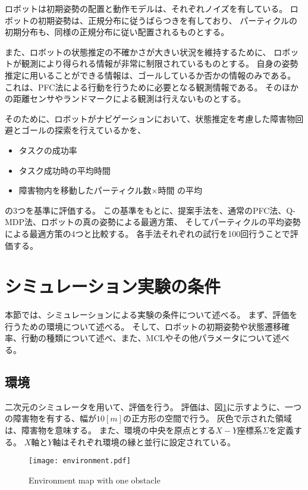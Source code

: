 ロボットは初期姿勢の配置と動作モデルは、それぞれノイズを有している。
ロボットの初期姿勢は、正規分布に従うばらつきを有しており、
パーティクルの初期分布も、同様の正規分布に従い配置されるものとする。

また、ロボットの状態推定の不確かさが大きい状況を維持するために、
ロボットが観測により得られる情報が非常に制限されているものとする。
自身の姿勢推定に用いることができる情報は、ゴールしているか否かの情報のみである。
これは、PFC法による行動を行うために必要となる観測情報である。
そのほかの距離センサやランドマークによる観測は行えないものとする。

そのために、ロボットがナビゲーションにおいて、状態推定を考慮した障害物回避とゴールの探索を行えているかを、
\begin{itemize}
  \item タスクの成功率
  \item タスク成功時の平均時間
  \item 障害物内を移動したパーティクル数×時間 の平均
\end{itemize}
の3つを基準に評価する。
この基準をもとに、提案手法を、通常のPFC法、Q-MDP法、ロボットの真の姿勢による最適方策、
そしてパーティクルの平均姿勢による最適方策の4つと比較する。
各手法それぞれの試行を100回行うことで評価する。


\section{シミュレーション実験の条件} \label{section:実験条件}
本節では、シミュレーションによる実験の条件について述べる。
まず、評価を行うための環境について述べる。
そして、ロボットの初期姿勢や状態遷移確率、行動の種類について述べ、また、MCLやその他パラメータについて述べる。

\subsection{環境}
二次元のシミュレータを用いて、評価を行う。
評価は、図\ref{fig:environment}に示すように、一つの障害物を有する、幅が$10[\si{m}]$の正方形の空間で行う。
灰色で示された領域は、障害物を意味する。
また、環境の中央を原点とする$X-Y$座標系$\Sigma$を定義する。
$X$軸と$Y$軸はそれぞれ環境の縁と並行に設定されている。
\begin{figure}[tbp]
  \begin{center}
    \texttt{[image: environment.pdf]}
    \caption{Environment map with one obstacle}
    \label{fig:environment}
  \end{center}
\end{figure}

